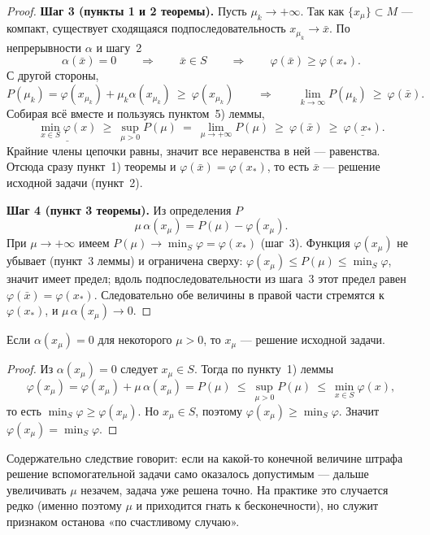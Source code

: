 \begin{proof}
\medskip
\textbf{Шаг 3 (пункты 1 и 2 теоремы).} Пусть $\mu_k \to +\infty$. Так как
$\{x_\mu\} \subset M$ — компакт, существует сходящаяся подпоследовательность
$x_{\mu_k} \to \bar{x}$. По непрерывности $\alpha$ и шагу~2
\[
  \alpha(\bar{x}) = 0 \qquad\Longrightarrow\qquad \bar{x} \in S
  \qquad\Longrightarrow\qquad \varphi(\bar{x}) \ge \varphi(x_*) .
\]
С другой стороны,
\[
  P(\mu_k) = \varphi(x_{\mu_k}) + \mu_k \alpha(x_{\mu_k}) \ \ge\ \varphi(x_{\mu_k})
  \qquad\Longrightarrow\qquad
  \lim_{k \to \infty} P(\mu_k) \ \ge\ \varphi(\bar{x}) .
\]
Собирая всё вместе и пользуясь пунктом~5) леммы,
\[
  \underline{\min_{x \in S}\varphi(x)}
  \ \ge\ \sup_{\mu > 0} P(\mu)
  \ =\ \lim_{\mu \to +\infty} P(\mu)
  \ \ge\ \varphi(\bar{x})
  \ \ge\ \underline{\varphi(x_*)} .
\]
Крайние члены цепочки равны, значит все неравенства в ней — равенства. Отсюда
сразу пункт~1) теоремы и $\varphi(\bar{x}) = \varphi(x_*)$, то есть $\bar{x}$ —
решение исходной задачи (пункт~2).

\medskip
\textbf{Шаг 4 (пункт 3 теоремы).} Из определения $P$
\[
  \mu\,\alpha(x_\mu) = P(\mu) - \varphi(x_\mu) .
\]
При $\mu \to +\infty$ имеем $P(\mu) \to \min_S\varphi = \varphi(x_*)$ (шаг~3).
Функция $\varphi(x_\mu)$ не убывает (пункт~3 леммы) и ограничена сверху:
$\varphi(x_\mu) \le P(\mu) \le \min_S\varphi$, значит имеет предел; вдоль
подпоследовательности из шага~3 этот предел равен
$\varphi(\bar{x}) = \varphi(x_*)$. Следовательно обе величины в правой части
стремятся к $\varphi(x_*)$, и $\mu\,\alpha(x_\mu) \to 0$.
\end{proof}

\begin{corollary*}
Если $\alpha(x_\mu) = 0$ для некоторого $\mu > 0$, то $x_\mu$ — решение исходной
задачи.
\end{corollary*}

\begin{proof}
Из $\alpha(x_\mu) = 0$ следует $x_\mu \in S$. Тогда по пункту~1) леммы
\[
  \varphi(x_\mu) = \varphi(x_\mu) + \mu\,\alpha(x_\mu) = P(\mu)
  \ \le\ \sup_{\mu > 0} P(\mu) \ \le\ \min_{x \in S}\varphi(x) ,
\]
то есть $\min_S\varphi \ge \varphi(x_\mu)$. Но $x_\mu \in S$, поэтому
$\varphi(x_\mu) \ge \min_S\varphi$. Значит $\varphi(x_\mu) = \min_S\varphi$.
\end{proof}

\begin{idea}
Содержательно следствие говорит: если на какой-то конечной величине штрафа
решение вспомогательной задачи само оказалось допустимым — дальше увеличивать
$\mu$ незачем, задача уже решена точно. На практике это случается редко
(именно поэтому $\mu$ и приходится гнать к бесконечности), но служит признаком
останова «по счастливому случаю».
\end{idea}

